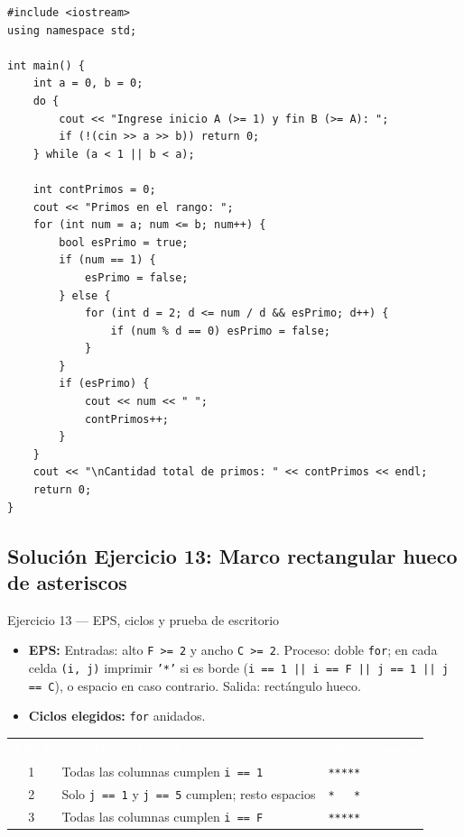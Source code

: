 \documentclass[11pt,letterpaper]{article}
\begin{document}
\begin{lstlisting}[style=cppmonitoria,caption={Solución Ejercicio 12: Primos en un rango con ciclos anidados (C++)}]
#include <iostream>
using namespace std;

int main() {
    int a = 0, b = 0;
    do {
        cout << "Ingrese inicio A (>= 1) y fin B (>= A): ";
        if (!(cin >> a >> b)) return 0;
    } while (a < 1 || b < a);

    int contPrimos = 0;
    cout << "Primos en el rango: ";
    for (int num = a; num <= b; num++) {
        bool esPrimo = true;
        if (num == 1) {
            esPrimo = false;
        } else {
            for (int d = 2; d <= num / d && esPrimo; d++) {
                if (num % d == 0) esPrimo = false;
            }
        }
        if (esPrimo) {
            cout << num << " ";
            contPrimos++;
        }
    }
    cout << "\nCantidad total de primos: " << contPrimos << endl;
    return 0;
}
\end{lstlisting}

\subsection{Solución Ejercicio 13: Marco rectangular hueco de asteriscos}

\begin{solucion}{Ejercicio 13 --- EPS, ciclos y prueba de escritorio}
\begin{itemize}
  \item \textbf{EPS:} Entradas: alto \texttt{F >= 2} y ancho \texttt{C >= 2}. Proceso: doble \texttt{for}; en cada celda \texttt{(i, j)} imprimir \texttt{'*'} si es borde (\texttt{i == 1 || i == F || j == 1 || j == C}), o espacio en caso contrario. Salida: rectángulo hueco.
  \item \textbf{Ciclos elegidos:} \texttt{for} anidados.
\end{itemize}
\begin{center}
\footnotesize
\renewcommand{\arraystretch}{1.15}
\begin{tabularx}{0.85\linewidth}{c X X}
\rowcolor{AzulMarino}
\textcolor{white}{\textbf{Fila \texttt{i}}} & \textcolor{white}{\textbf{Criterio (\texttt{F=3, C=5})}} & \textcolor{white}{\textbf{Línea impresa}} \\
1 & Todas las columnas cumplen \texttt{i == 1} & \texttt{*****} \\
2 & Solo \texttt{j == 1} y \texttt{j == 5} cumplen; resto espacios & \texttt{*\ \ \ *} \\
3 & Todas las columnas cumplen \texttt{i == F} & \texttt{*****} \\
\bottomrule
\end{tabularx}
\end{center}
\end{solucion}
\end{document}
